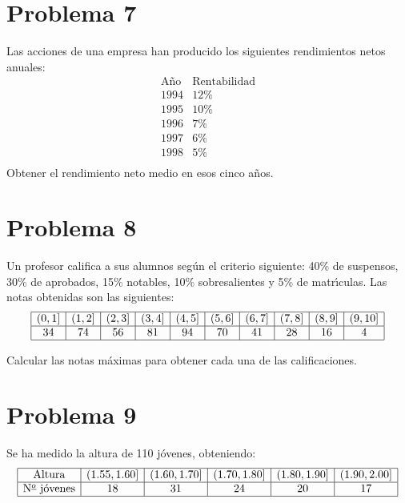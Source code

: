 \documentclass{article}
\begin{document}
	\section{Problema 7}
	\color{blue}
	Las acciones de una empresa han producido los  siguientes  rendimientos
	netos anuales:
	$$
	\begin{array}{cc}
	\mbox{A{\~n}o} & \mbox{Rentabilidad} \\ \hline
	1994  &        12\%     \\
	1995  &        10\%     \\
	1996  &         7\%     \\
	1997  &         6\%     \\
	1998  &         5\%     \\
	\end{array}
	$$
	Obtener el rendimiento neto medio en esos cinco a{\~n}os. \\
	\color{black}
	
	
	
	
	\section{Problema 8}
	\color{blue}
	Un profesor califica a sus alumnos seg{\'u}n el criterio siguiente: 40\%  de
	suspensos, 30\% de aprobados, 15\% notables, 10\% sobresalientes y  5\%  de
	matr{\'\i}culas. Las notas obtenidas son las si\-guien\-tes:
	$$
	\begin{array}{|c|c|c|c|c|c|c|c|c|c|} \hline
	(0,1] & (1,2] & (2,3] & (3,4] & (4,5] & (5,6] & (6,7] & (7,8] & (8,9] & (9,10] \\ \hline
	34 & 74  & 56  &  81 &  94 &  70 &  41 &  28 &  16 &  4  \\ \hline
	\end{array}
	$$
	
	Calcular las notas m{\'a}ximas para obtener cada una de las calificaciones. \\
	
	\color{black}
	
	
	
	
	\section{Problema 9}
	\color{blue}
	Se ha medido la altura de 110 j{\'o}venes, obteniendo:
	$$
	\begin{array}{|c|c|c|c|c|c|c|c|c|c|} \hline
	\mbox{Altura}     & (1\mbox{.}55,1\mbox{.}60] &
	(1\mbox{.}60,1\mbox{.}70] & (1\mbox{.}70,1\mbox{.}80] &
	(1\mbox{.}80,1\mbox{.}90] & (1\mbox{.}90,2\mbox{.}00] \\ \hline
	\mbox{N${}^{\underline{o}}$ j{\'o}venes} & 18 & 31     &  24       &
	20    &  17  \\ \hline
	\end{array}
	$$
	
\end{document}
